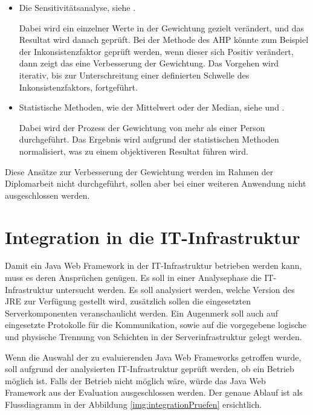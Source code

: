   \begin{itemize}
    \item Die Sensitivitätsanalyse, siehe \cite{Sensitivitaetsanalyse}.
    
    Dabei wird ein einzelner Werte in der Gewichtung gezielt verändert, und das
    Resultat wird danach geprüft. Bei der Methode des \ac{AHP} könnte zum
    Beispiel der Inkonsistenzfaktor geprüft werden, wenn dieser sich Positiv
    verändert, dann zeigt das eine Verbesserung der Gewichtung. Das Vorgehen
    wird iterativ, bis zur Unterschreitung einer definierten Schwelle des
    Inkonsistenzfaktors, fortgeführt.
    
    \item Statistische Methoden, wie der Mittelwert oder der Median, siehe
    \cite{Median} und \cite{Mittelwert}.
    
    Dabei wird der Prozess der Gewichtung von mehr als einer Person
    durchgeführt. Das Ergebnis wird aufgrund der statistischen Methoden
    normalisiert, was zu einem objektiveren Resultat führen wird.
  \end{itemize}
  
  Diese Ansätze zur Verbesserung der Gewichtung werden im Rahmen der
  Diplomarbeit nicht durchgeführt, sollen aber bei einer weiteren Anwendung
  nicht ausgeschlossen werden.
  
  \section{Integration in die IT-Infrastruktur}
  
  Damit ein Java Web Framework in der IT-Infrastruktur betrieben werden kann,
  muss es deren Ansprüchen genügen. Es soll in einer Analysephase die
  IT-Infrastruktur untersucht werden. Es soll analysiert werden, welche Version
  des \ac{JRE} zur Verfügung gestellt wird, zusätzlich sollen die eingesetzten
  Serverkomponenten veranschaulicht werden. Ein Augenmerk soll auch auf
  eingesetzte Protokolle für die Kommunikation, sowie auf die vorgegebene
  logische und physische Trennung von Schichten in der Serverinfrastruktur
  gelegt werden.
  
  Wenn die Auswahl der zu evaluierenden Java Web Frameworks getroffen wurde,
  soll aufgrund der analysierten IT-Infrastruktur geprüft werden, ob ein Betrieb
  möglich ist. Falls der Betrieb nicht möglich wäre, würde das Java Web
  Framework aus der Evaluation ausgeschlossen werden. Der genaue Ablauf ist als
  Flussdiagramm in der Abbildung \ref{img:integrationPruefen} ersichtlich.
  
